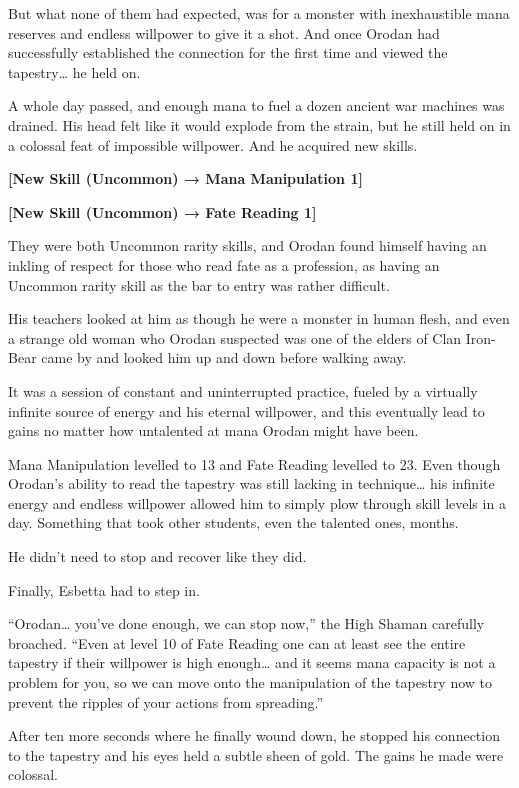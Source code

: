 \documentclass[a4paper,10pt]{book}
\begin{document}
But what none of them had expected, was for a monster with inexhaustible mana reserves and endless willpower to give it a shot. And once Orodan had successfully established the connection for the first time and viewed the tapestry… he held on.\par
A whole day passed, and enough mana to fuel a dozen ancient war machines was drained. His head felt like it would explode from the strain, but he still held on in a colossal feat of impossible willpower. And he acquired new skills.\par
\textbf{[New Skill (Uncommon) → Mana Manipulation 1]}\par
\textbf{[New Skill (Uncommon) → Fate Reading 1]}\par
They were both Uncommon rarity skills, and Orodan found himself having an inkling of respect for those who read fate as a profession, as having an Uncommon rarity skill as the bar to entry was rather difficult.\par
His teachers looked at him as though he were a monster in human flesh, and even a strange old woman who Orodan suspected was one of the elders of Clan Iron-Bear came by and looked him up and down before walking away.\par
It was a session of constant and uninterrupted practice, fueled by a virtually infinite source of energy and his eternal willpower, and this eventually lead to gains no matter how untalented at mana Orodan might have been.\par
Mana Manipulation levelled to 13 and Fate Reading levelled to 23. Even though Orodan’s ability to read the tapestry was still lacking in technique… his infinite energy and endless willpower allowed him to simply plow through skill levels in a day. Something that took other students, even the talented ones, months.\par
He didn’t need to stop and recover like they did.\par
Finally, Esbetta had to step in.\par
“Orodan… you’ve done enough, we can stop now,” the High Shaman carefully broached. “Even at level 10 of Fate Reading one can at least see the entire tapestry if their willpower is high enough… and it seems mana capacity is not a problem for you, so we can move onto the manipulation of the tapestry now to prevent the ripples of your actions from spreading.”\par
After ten more seconds where he finally wound down, he stopped his connection to the tapestry and his eyes held a subtle sheen of gold. The gains he made were colossal.\par
\end{document}
